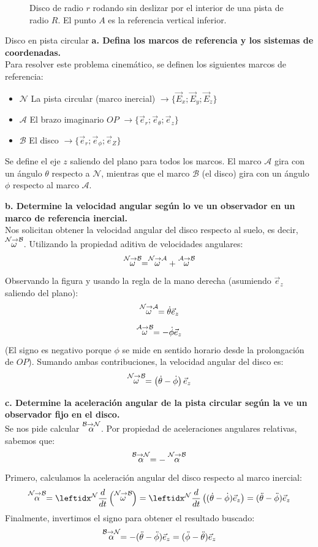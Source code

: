 \begin{figure}[!ht]
    \caption{Disco de radio $r$ rodando sin deslizar por el interior de una pista de radio $R$. El punto $A$ es la referencia vertical inferior.}
    \label{fig:disco_pista}
\end{figure}

\begin{solucion}{Disco en pista circular}
\textbf{a. Defina los marcos de referencia y los sistemas de coordenadas.}\\
Para resolver este problema cinemático, se definen los siguientes marcos de referencia:
\begin{itemize}
    \item $\mathcal{N}$ La pista circular (marco inercial) $\longrightarrow\{\vec{E}_x;\vec{E}_y;\vec{E}_z\}$
    \item $\mathcal{A}$ El brazo imaginario $OP$ $\longrightarrow\{\vec{e}_r;\vec{e}_\theta;\vec{e}_z\}$
    \item $\mathcal{B}$ El disco $\longrightarrow\{\vec{e}_r;\vec{e}_\phi;\vec{e}_Z\}$
\end{itemize}
Se define el eje $z$ saliendo del plano para todos los marcos. El marco $\mathcal{A}$ gira con un ángulo $\theta$ respecto a $\mathcal{N}$, mientras que el marco $\mathcal{B}$ (el disco) gira con un ángulo $\phi$ respecto al marco $\mathcal{A}$.

\textbf{b. Determine la velocidad angular según lo ve un observador en un marco de referencia inercial.}\\
Nos solicitan obtener la velocidad angular del disco respecto al suelo, es decir, $\stackrel{\mathcal{N} \to \mathcal{B}}{\omega}$. Utilizando la propiedad aditiva de velocidades angulares:
$$\stackrel{\mathcal{N} \to \mathcal{B}}{\omega}=\stackrel{\mathcal{N} \to \mathcal{A}}{\omega}+\stackrel{\mathcal{A} \to \mathcal{B}}{\omega}$$
Observando la figura y usando la regla de la mano derecha (asumiendo $\vec{e}_z$ saliendo del plano):
$$\stackrel{\mathcal{N} \to \mathcal{A}}{\omega}=\dot\theta\vec{e}_z$$
$$\stackrel{\mathcal{A} \to \mathcal{B}}{\omega}=-\dot\phi\vec{e}_z$$
(El signo es negativo porque $\phi$ se mide en sentido horario desde la prolongación de $OP$).
Sumando ambas contribuciones, la velocidad angular del disco es:
$$\stackrel{\mathcal{N} \to \mathcal{B}}{\omega}=\left(\dot\theta-\dot\phi\right)\vec{e}_z$$

\textbf{c. Determine la aceleración angular de la pista circular según la ve un observador fijo en el disco.}\\
Se nos pide calcular $\stackrel{\mathcal{B} \to \mathcal{N}}{\alpha}$. Por propiedad de aceleraciones angulares relativas, sabemos que:
$$\stackrel{\mathcal{B} \to \mathcal{N}}{\alpha} = -\stackrel{\mathcal{N} \to \mathcal{B}}{\alpha}$$
Primero, calculamos la aceleración angular del disco respecto al marco inercial:
$$\accang{N}{B} = \der{}{N}\left(\velang{N}{B}\right) = \der{}{N}\left((\dot\theta-\dot\phi)\vec{e}_z\right) = (\ddot\theta-\ddot\phi)\vec{e}_z$$
Finalmente, invertimos el signo para obtener el resultado buscado:
$$\stackrel{\mathcal{B} \to \mathcal{N}}{\alpha} = -(\ddot\theta-\ddot\phi)\vec{e}_z = (\ddot\phi-\ddot\theta)\vec{e}_z$$


\end{solucion}
